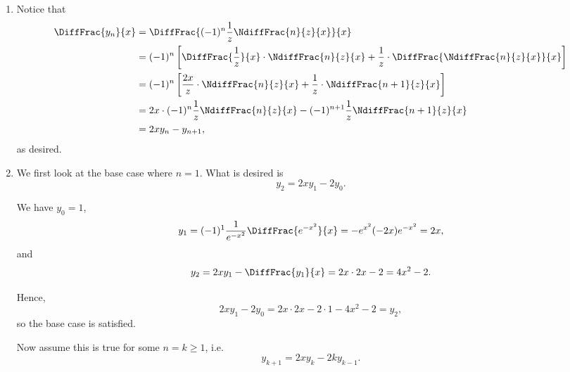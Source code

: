 \Question{\currfilebase}

\begin{enumerate}
    \item Notice that
          \begin{align*}
              \DiffFrac{y_n}{x} & = \DiffFrac{(-1)^n \frac{1}{z} \NdiffFrac{n}{z}{x}}{x}                                                                          \\
                                & = (-1)^n \left[\DiffFrac{\frac{1}{z}}{x} \cdot \NdiffFrac{n}{z}{x} + \frac{1}{z} \cdot \DiffFrac{\NdiffFrac{n}{z}{x}}{x}\right] \\
                                & = (-1)^n \left[\frac{2x}{z} \cdot \NdiffFrac{n}{z}{x} + \frac{1}{z} \cdot \NdiffFrac{n + 1}{z}{x}\right]                        \\
                                & = 2x \cdot (-1)^n \frac{1}{z} \NdiffFrac{n}{z}{x} - (-1)^{n + 1} \frac{1}{z} \NdiffFrac{n + 1}{z}{x}                            \\
                                & = 2x y_n - y_{n + 1},
          \end{align*}
          as desired.

    \item We first look at the base case where \(n = 1\). What is desired is
          \[
              y_2 = 2 x y_1 - 2 y_0.
          \]

          We have \(y_0 = 1\),
          \[
              y_1 = (-1)^1 \frac{1}{e^{-x^2}} \DiffFrac{e^{-x^2}}{x} = - e^{x^2} (-2x) e^{-x^2} = 2x,
          \]
          and
          \[
              y_2 = 2x y_1 - \DiffFrac{y_1}{x} = 2x \cdot 2x - 2 = 4x^2 - 2.
          \]

          Hence,
          \[
              2x y_1 - 2 y_0 = 2x \cdot 2x - 2 \cdot 1 - 4x^2 - 2 = y_2,
          \]
          so the base case is satisfied.

          Now assume this is true for some \(n = k \geq 1\), i.e.
          \[
              y_{k + 1} = 2 x y_k - 2 k y_{k - 1}.
          \]


\end{enumerate}
